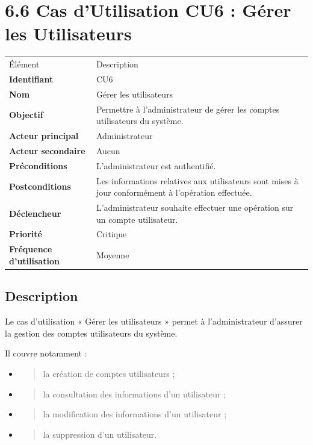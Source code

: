 \documentclass[
]{book}
\begin{document}
\hypertarget{cas-dutilisation-cu6-guxe9rer-les-utilisateurs}{%
\section{6.6 Cas d'Utilisation CU6 : Gérer les
Utilisateurs}\label{cas-dutilisation-cu6-guxe9rer-les-utilisateurs}}

\begin{longtable}[]{@{}ll@{}}
\toprule
\endhead
Élément & Description \\
\textbf{Identifiant} & CU6 \\
\textbf{Nom} & Gérer les utilisateurs \\
\textbf{Objectif} & Permettre à l'administrateur de gérer les comptes
utilisateurs du système. \\
\textbf{Acteur principal} & Administrateur \\
\textbf{Acteur secondaire} & Aucun \\
\textbf{Préconditions} & L'administrateur est authentifié. \\
\textbf{Postconditions} & Les informations relatives aux utilisateurs
sont mises à jour conformément à l'opération effectuée. \\
\textbf{Déclencheur} & L'administrateur souhaite effectuer une opération
sur un compte utilisateur. \\
\textbf{Priorité} & Critique \\
\textbf{Fréquence d'utilisation} & Moyenne \\
\bottomrule
\end{longtable}

\hypertarget{description-4}{%
\subsection{Description}\label{description-4}}

Le cas d'utilisation « Gérer les utilisateurs » permet à
l'administrateur d'assurer la gestion des comptes utilisateurs du
système.

Il couvre notamment :

\begin{itemize}
\item
  \begin{quote}
  la création de comptes utilisateurs ;
  \end{quote}
\item
  \begin{quote}
  la consultation des informations d'un utilisateur ;
  \end{quote}
\item
  \begin{quote}
  la modification des informations d'un utilisateur ;
  \end{quote}
\item
  \begin{quote}
  la suppression d'un utilisateur.
  \end{quote}
\end{itemize}
\end{document}
